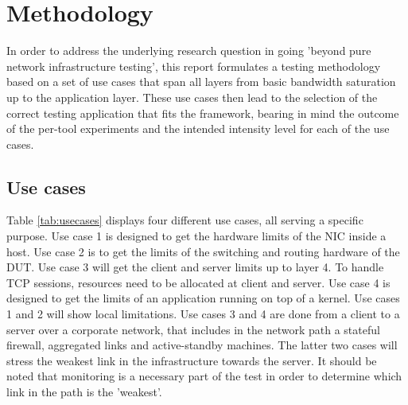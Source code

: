 \chapter{Methodology}\label{ch:method}
In order to address the underlying research question in going 'beyond pure network infrastructure testing', this report formulates a testing methodology based on a set of use cases that span all layers from basic bandwidth saturation up to the application layer.
These use cases then lead to the selection of the correct testing application that fits the framework, bearing in mind the outcome of the per-tool experiments and the intended intensity level for each of the use cases.

\section{Use cases}\label{sec:usecase}

Table \ref{tab:usecases} displays four different use cases, all serving a specific purpose.
Use case 1 is designed to get the hardware limits of the NIC inside a host. Use case 2 is to get the limits of the  switching and routing hardware of the DUT.
Use case 3 will get the client and server limits up to layer 4. To handle TCP sessions, resources need to be allocated at client and server. 
Use case 4 is designed to get the limits of an application running on top of a kernel.  
Use cases 1 and 2 will show local limitations. 
Use cases 3 and 4 are done from a client to a server over a corporate network, that includes in the network path a stateful firewall, aggregated links and active-standby machines. The latter two cases will stress the weakest link in the infrastructure towards the server.  
It should be noted that monitoring is a necessary part of the test in order to determine which link in the path is the 'weakest'.

